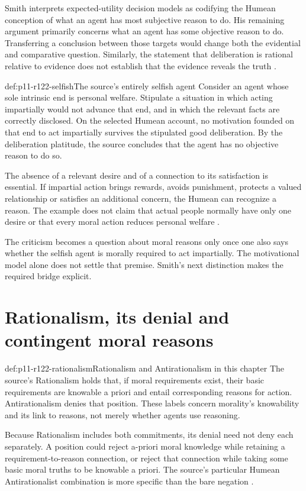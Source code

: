 Smith interprets expected-utility decision models as codifying the
Humean conception of what an agent has most subjective reason to do.
His remaining argument primarily concerns what an agent has some
objective reason to do. Transferring a conclusion between those targets
would change both the evidential and comparative question. Similarly,
the statement that deliberation is rational relative to evidence does
not establish that the evidence reveals the truth
\parencite[p.~695]{Smith2021MoralReasons}.

\begin{hbexample}{def:p11-r122-selfish}{The source's entirely selfish agent}
Consider an agent whose sole intrinsic end is personal welfare. Stipulate
a situation in which acting impartially would not advance that end, and
in which the relevant facts are correctly disclosed. On the selected
Humean account, no motivation founded on that end to act impartially
survives the stipulated good deliberation. By the deliberation platitude,
the source concludes that the agent has no objective reason to do so.

The absence of a relevant desire and of a connection to its satisfaction
is essential. If impartial action brings rewards, avoids punishment,
protects a valued relationship or satisfies an additional concern, the
Humean can recognize a reason. The example does not claim that actual
people normally have only one desire or that every moral action reduces
personal welfare \parencite[p.~695]{Smith2021MoralReasons}.
\end{hbexample}

The criticism becomes a question about moral reasons only once one also
says whether the selfish agent is morally required to act impartially.
The motivational model alone does not settle that premise. Smith's
next distinction makes the required bridge explicit.

\section{Rationalism, its denial and contingent moral reasons}
\label{sec:p11-r122-rationalism}

\begin{hbdefinition}{def:p11-r122-rationalism}{Rationalism and Antirationalism in this chapter}
The source's Rationalism holds that, if moral requirements exist, their
basic requirements are knowable a priori and entail corresponding
reasons for action. Antirationalism denies that position. These labels
concern morality's knowability and its link to reasons, not merely whether
agents use reasoning.

Because Rationalism includes both commitments, its denial need not deny
each separately. A position could reject a-priori moral knowledge while
retaining a requirement-to-reason connection, or reject that connection
while taking some basic moral truths to be knowable a priori. The source's
particular Humean Antirationalist combination is more specific than the
bare negation \parencite[pp.~695--696]{Smith2021MoralReasons}.
\end{hbdefinition}

